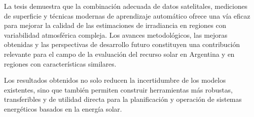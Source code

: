 La tesis demuestra que la combinación adecuada de datos satelitales, mediciones de superficie y técnicas modernas de aprendizaje automático ofrece una vía eficaz para mejorar la calidad de las estimaciones de irradiancia en regiones con variabilidad atmosférica compleja. Los avances metodológicos, las mejoras obtenidas y las perspectivas de desarrollo futuro constituyen una contribución relevante para el campo de la evaluación del recurso solar en Argentina y en regiones con características similares.

Los resultados obtenidos no solo reducen la incertidumbre de los modelos existentes, sino que también permiten construir herramientas más robustas, transferibles y de utilidad directa para la planificación y operación de sistemas energéticos basados en la energía solar.

